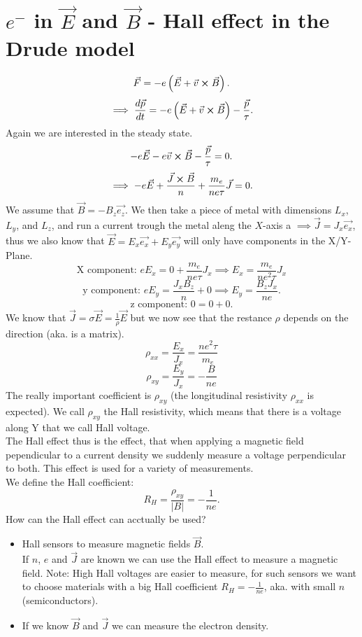 \documentclass{report}
\begin{document}
\section{$e^-$ in $\vec{E}$ and $\vec{B}$ - Hall effect in the Drude model}
\[
	\vec{F} = -e\left( \vec{E} + \vec{v} \cross \vec{B} \right) 
.\] \[
\implies \frac{d\vec{p}}{dt} = - e\left( \vec{E} + \vec{v} \cross \vec{B} \right) - \frac{\vec{p}}{\tau}
.\] Again we are interested in the steady state. \[
-e\vec{E} - e \vec{v}\cross \vec{B} - \frac{\vec{p}}{\tau} = 0
.\] \[
\implies -e\vec{E} + \frac{\vec{J} \cross \vec{B}}{n} + \frac{m_e}{ne\tau}\vec{J} = 0
	.\] We assume that $\vec{B} = -B_z \vec{e_z}$. We then take a piece of metal with dimensions $L_x$, $L_y$, and $L_z$, and run a current trough the metal aleng the $X$-axis a $\implies \vec{J} = J_x \vec{e_x}$, thus we also know that $\vec{E} = E_x \vec{e_x} + E_y \vec{e_y}$ will only have components in the X/Y-Plane.
\[
	\text{X component: } eE_x = 0 + \frac{m_e}{ne\tau}J_x \implies E_x = \frac{m_e}{ne^2\tau}J_x				
\] \[
\text{y component: } eE_y = \frac{J_x B_z}{n} + 0 \implies E_y = \frac{B_z J_x}{n e}
.\] \[
\text{z component: } 0 = 0 + 0
.\] We know that $\vec{J} = \sigma \vec{E} = \frac{1}{\rho} \vec{E}$ but we now see that the restance $\rho $ depends on the direction (aka. is a matrix). \[
\rho_{x x} = \frac{E_x}{J_x} = \frac{ne^2 \tau }{m_e}
\]\[
\rho_{x y} = \frac{E_y}{J_x} = - \frac{B}{n e}
\] The really important coefficient is $\rho_{x y}$ (the longitudinal resistivity $\rho_{x x}$ is expected). We call $\rho_{x y}$ the Hall resistivity, which means that there is a voltage along Y that we call Hall voltage. \\
The Hall effect thus is the effect, that when applying a magnetic field pependicular to a current density we suddenly measure a voltage perpendicular to both. This effect is used for a variety of measurements.\\
We define the Hall coefficient:  \[
	R_H = \frac{\rho_{xy}}{ |B| } = - \frac{1}{ne}
.\] How can the Hall effect can acctually be used? 
\begin{itemize}
	\item Hall sensors to measure magnetic fields $\vec{B}$.\\
		If $n$, $e$ and $\vec{J}$ are known we can use the Hall effect to measure a magnetic field. Note: High Hall voltages are easier to measure, for such sensors we want to choose materials with a big Hall coefficient $R_H = -\frac{1}{ne}$, aka. with small $n$ (semiconductors).
	\item If we know $\vec{B}$ and $\vec{J}$ we can measure the electron density.
\end{itemize}
\end{document}
